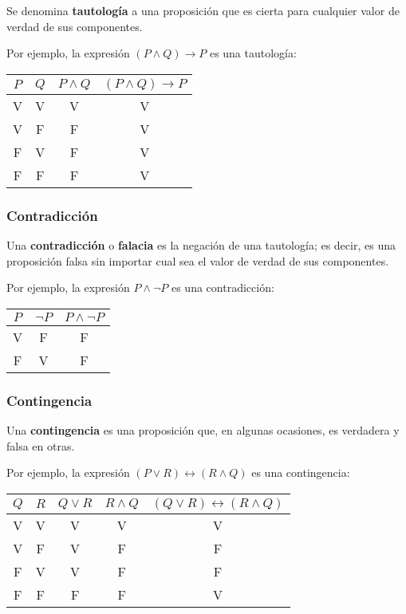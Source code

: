 Se denomina \textbf{tautología} a una proposición que es cierta para cualquier valor de verdad de sus componentes.
                
Por ejemplo, la expresión $(P \wedge Q) \rightarrow P$ es una tautología:

\begin{center}
    \centering
    \begin{tabular}{c|c|c|c}
        $P$ & $Q$ & $P \wedge Q$ & $(P \wedge Q) \rightarrow P$  \\
        \hline
        V & V & V & V \\
        V & F & F & V \\
        F & V & F & V \\
        F & F & F & V
    \end{tabular}
    \label{tab:tautologia-tabla}
\end{center}

\subsubsection{Contradicción}

Una \textbf{contradicción} o \textbf{falacia} es la negación de una tautología; es decir, es una proposición falsa sin importar cual sea el valor de verdad de sus componentes.
                
Por ejemplo, la expresión $P \wedge \neg P$ es una contradicción:

\begin{center}
    \centering
    \begin{tabular}{c|c|c}
        $P$ & $\neg P$ & $P \wedge \neg P$  \\
        \hline
        V & F & F \\
        F & V & F
    \end{tabular}
    \label{tab:contradiccion-tabla}
\end{center}

\subsubsection{Contingencia}

Una \textbf{contingencia} es una proposición que, en algunas ocasiones, es verdadera y falsa en otras.
               
Por ejemplo, la expresión $(P \vee R) \leftrightarrow (R \wedge Q)$ es una contingencia:

\begin{center}
    \centering
    \begin{tabular}{c|c|c|c|c}
        $Q$ & $R$ & $Q \vee R$ & $R \wedge Q$ & $(Q \vee R) \leftrightarrow (R \wedge Q)$  \\
        \hline
        V & V & V & V & V \\
        V & F & V & F & F \\
        F & V & V & F & F \\
        F & F & F & F & V
    \end{tabular}
    \label{tab:contingencia-tabla}
\end{center}


